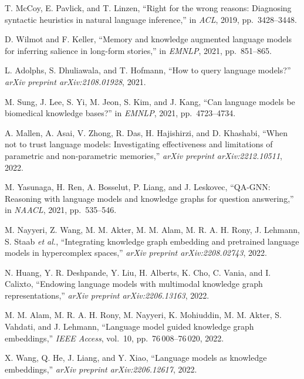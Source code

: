 \begin{enumerate}[leftmargin=2em,label={[\arabic*]}]
\item T. McCoy, E. Pavlick, and T. Linzen, ``Right for the wrong reasons: Diagnosing syntactic heuristics in natural language inference,'' in \textit{ACL}, 2019, pp.~3428--3448.

\item D. Wilmot and F. Keller, ``Memory and knowledge augmented language models for inferring salience in long-form stories,'' in \textit{EMNLP}, 2021, pp.~851--865.

\item L. Adolphs, S. Dhuliawala, and T. Hofmann, ``How to query language models?'' \textit{arXiv preprint arXiv:2108.01928}, 2021.

\item M. Sung, J. Lee, S. Yi, M. Jeon, S. Kim, and J. Kang, ``Can language models be biomedical knowledge bases?'' in \textit{EMNLP}, 2021, pp.~4723--4734.

\item A. Mallen, A. Asai, V. Zhong, R. Das, H. Hajishirzi, and D. Khashabi, ``When not to trust language models: Investigating effectiveness and limitations of parametric and non-parametric memories,'' \textit{arXiv preprint arXiv:2212.10511}, 2022.

\item M. Yasunaga, H. Ren, A. Bosselut, P. Liang, and J. Leskovec, ``QA-GNN: Reasoning with language models and knowledge graphs for question answering,'' in \textit{NAACL}, 2021, pp.~535--546.

\item M. Nayyeri, Z. Wang, M. M. Akter, M. M. Alam, M. R. A. H. Rony, J. Lehmann, S. Staab \textit{et al.}, ``Integrating knowledge graph embedding and pretrained language models in hypercomplex spaces,'' \textit{arXiv preprint arXiv:2208.02743}, 2022.

\item N. Huang, Y. R. Deshpande, Y. Liu, H. Alberts, K. Cho, C. Vania, and I. Calixto, ``Endowing language models with multimodal knowledge graph representations,'' \textit{arXiv preprint arXiv:2206.13163}, 2022.

\item M. M. Alam, M. R. A. H. Rony, M. Nayyeri, K. Mohiuddin, M. M. Akter, S. Vahdati, and J. Lehmann, ``Language model guided knowledge graph embeddings,'' \textit{IEEE Access}, vol.~10, pp.~76\,008--76\,020, 2022.

\item X. Wang, Q. He, J. Liang, and Y. Xiao, ``Language models as knowledge embeddings,'' \textit{arXiv preprint arXiv:2206.12617}, 2022.


\end{enumerate}
